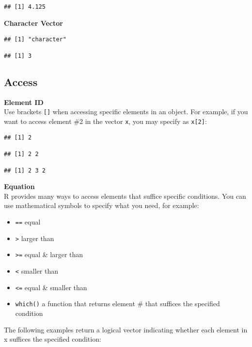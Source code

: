 \documentclass[
]{book}
\providecommand{\tightlist}{%
  \setlength{\itemsep}{0pt}\setlength{\parskip}{0pt}}
\begin{document}
\begin{verbatim}
## [1] 4.125
\end{verbatim}

\textbf{Character Vector}

\begin{verbatim}
## [1] "character"
\end{verbatim}

\begin{verbatim}
## [1] 3
\end{verbatim}

\hypertarget{access}{%
\subsection{Access}\label{access}}

\textbf{Element ID}\\
Use brackets \texttt{{[}{]}} when accessing specific elements in an object. For example, if you want to access element \#2 in the vector \texttt{x}, you may specify as \texttt{x{[}2{]}}:

\begin{verbatim}
## [1] 2
\end{verbatim}

\begin{verbatim}
## [1] 2 2
\end{verbatim}

\begin{verbatim}
## [1] 2 3 2
\end{verbatim}

\textbf{Equation}\\
R provides many ways to access elements that suffice specific conditions. You can use mathematical symbols to specify what you need, for example:

\begin{itemize}
\tightlist
\item
  \texttt{==} equal
\item
  \texttt{\textgreater{}} larger than
\item
  \texttt{\textgreater{}=} equal \& larger than
\item
  \texttt{\textless{}} smaller than
\item
  \texttt{\textless{}=} equal \& smaller than
\item
  \texttt{which()} a function that returns element \# that suffices the specified condition
\end{itemize}

The following examples return a logical vector indicating whether each element in x suffices the specified condition:
\end{document}
